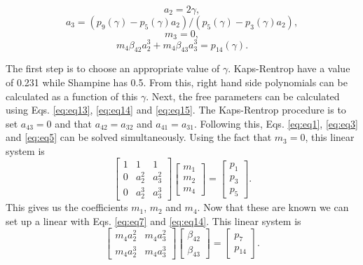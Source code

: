 \documentclass{ansconf}
\numberwithin{equation}{section}
\begin{document}
\begin{equation}\label{eq:eq13}
   a_2 = 2\gamma,
\end{equation}
\begin{equation}\label{eq:eq14}
    a_3 = \left(p_{9}\left(\gamma\right) - p_{5}\left(\gamma\right)a_2\right)/\left(p_{5}\left(\gamma\right) - p_{3}\left(\gamma\right)a_2\right),
\end{equation}
\begin{equation}\label{eq:eq15}
   m_3 = 0,
\end{equation}
\begin{equation}\label{eq:eq16}
   m_4\beta_{42}a_2^3 + m_4\beta_{43}a_3^3 = p_{14}\left(\gamma\right).
\end{equation}

The first step is to choose an appropriate value of $\gamma$. Kaps-Rentrop have a value of 0.231 while Shampine has 0.5. From this, right hand side polynomials can be calculated as a function of this $\gamma$. Next, the free parameters can be calculated using Eqs. \eqref{eq:eq13}, \eqref{eq:eq14} and \eqref{eq:eq15}. The Kaps-Rentrop procedure is to set $a_{43}=0$ and that $a_{42} = a_{32}$ and $a_{41} = a_{31}$. Following this, Eqs. \eqref{eq:eq1}, \eqref{eq:eq3} and \eqref{eq:eq5} can be solved simultaneously. Using the fact that $m_3=0$, this linear system is
\begin{equation}
	\left[ \begin{array}{ccc}
		1 & 1 & 1 \\
		0 & a_2^2 & a_3^2 \\
		0 & a_2^3 & a_3^3
			\end{array} \right] 
	\left[ \begin{array}{c}
		m_1 \\ m_2 \\ m_4
			\end{array}\right] =
	\left[ \begin{array}{c}
		p_1 \\ p_3 \\ p_5
			\end{array}\right].
\end{equation}
This gives us the coefficients $m_1$, $m_2$ and $m_4$. Now that these are known we can set up a linear with Eqs. \eqref{eq:eq7} and \eqref{eq:eq14}. This linear system is 
\begin{equation}
	\left[ \begin{array}{cc}
		m_4a_2^2 & m_4a_3^2 \\
		m_4a_2^3 & m_4a_3^3
			\end{array} \right] 
	\left[ \begin{array}{c}
		\beta_{42} \\ \beta_{43}
			\end{array}\right] =
	\left[ \begin{array}{c}
		p_7 \\ p_{14}
			\end{array}\right].
\end{equation}
\end{document}
